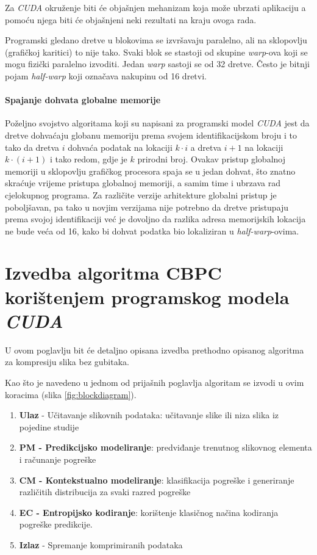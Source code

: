 \documentclass[times, utf8, zavrsni, numeric, sort]{fer}
\begin{document}
Za \emph{CUDA} okruženje biti će objašnjen mehanizam koja može ubrzati aplikaciju a pomoću njega biti će objašnjeni neki rezultati na kraju ovoga rada.

Programski gledano dretve u blokovima se izvršavaju paralelno, ali na sklopovlju (grafičkoj karitici) to nije tako. Svaki blok se stastoji od skupine \emph{warp}-ova koji se mogu fizički paralelno izvoditi. Jedan \emph{warp} sastoji se od 32 dretve. Često je bitnji pojam \emph{half-warp} koji označava nakupinu od 16 dretvi.

\subsubsection{Spajanje dohvata globalne memorije }

Poželjno svojstvo algoritama koji su napisani za programski model \emph{CUDA} jest da dretve dohvaćaju globanu memoriju prema svojem identifikacijskom broju i to tako da dretva $i$ dohvaća podatak na lokaciji $k\cdot i$ a dretva $i+1$ na lokaciji $k \cdot (i+1)$ i tako redom, gdje je $k$ prirodni broj. Ovakav pristup globalnoj memoriji u sklopovlju grafičkog procesora spaja se u jedan dohvat, što znatno skraćuje vrijeme pristupa globalnoj memoriji, a samim time i ubrzava rad cjelokupnog programa. Za različite verzije arhitekture globalni pristup je poboljšavan, pa tako u novjim verzijama nije potrebno da dretve pristupaju prema svojoj identifikaciji već je dovoljno da razlika adresa memorijskih lokacija ne bude veća od 16, kako bi dohvat podatka bio lokaliziran u \emph{half-warp}-ovima.


\chapter{Izvedba algoritma CBPC korištenjem programskog modela \emph{CUDA}}
U ovom poglavlju bit će detaljno opisana izvedba prethodno opisanog algoritma za kompresiju slika bez gubitaka.

Kao što je navedeno u jednom od prijašnih poglavlja algoritam se izvodi u ovim koracima (slika \ref{fig:blockdiagram}).
\begin{enumerate}
	\item \textbf{Ulaz} - Učitavanje slikovnih podataka: učitavanje slike ili niza slika iz pojedine studije
	\item \textbf{PM - Predikcijsko modeliranje}: predviđanje trenutnog slikovnog elementa i računanje pogreške
	\item \textbf{CM - Kontekstualno modeliranje}: klasifikacija pogreške i generiranje različitih distribucija za svaki razred pogreške
	\item \textbf{EC - Entropijsko kodiranje}: korištenje klasičnog načina kodiranja pogreške predikcije.
	\item \textbf{Izlaz} - Spremanje komprimiranih podataka
\end{enumerate}
\end{document}
